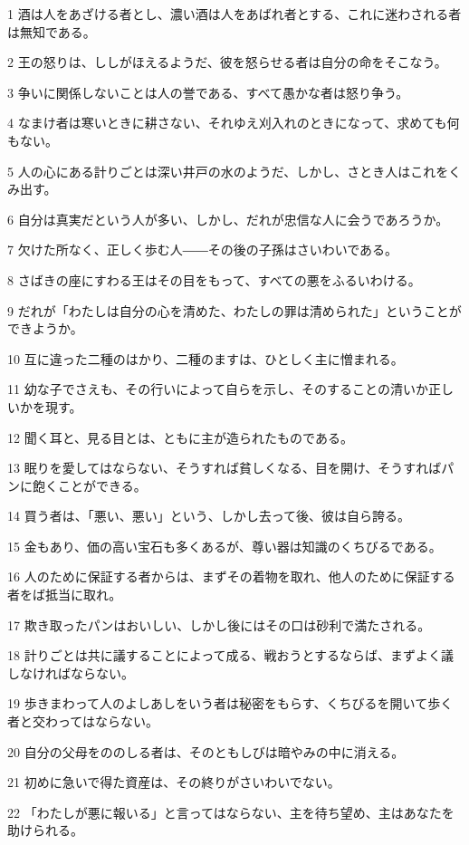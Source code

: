 \par 1 酒は人をあざける者とし、濃い酒は人をあばれ者とする、これに迷わされる者は無知である。
\par 2 王の怒りは、ししがほえるようだ、彼を怒らせる者は自分の命をそこなう。
\par 3 争いに関係しないことは人の誉である、すべて愚かな者は怒り争う。
\par 4 なまけ者は寒いときに耕さない、それゆえ刈入れのときになって、求めても何もない。
\par 5 人の心にある計りごとは深い井戸の水のようだ、しかし、さとき人はこれをくみ出す。
\par 6 自分は真実だという人が多い、しかし、だれが忠信な人に会うであろうか。
\par 7 欠けた所なく、正しく歩む人――その後の子孫はさいわいである。
\par 8 さばきの座にすわる王はその目をもって、すべての悪をふるいわける。
\par 9 だれが「わたしは自分の心を清めた、わたしの罪は清められた」ということができようか。
\par 10 互に違った二種のはかり、二種のますは、ひとしく主に憎まれる。
\par 11 幼な子でさえも、その行いによって自らを示し、そのすることの清いか正しいかを現す。
\par 12 聞く耳と、見る目とは、ともに主が造られたものである。
\par 13 眠りを愛してはならない、そうすれば貧しくなる、目を開け、そうすればパンに飽くことができる。
\par 14 買う者は、「悪い、悪い」という、しかし去って後、彼は自ら誇る。
\par 15 金もあり、価の高い宝石も多くあるが、尊い器は知識のくちびるである。
\par 16 人のために保証する者からは、まずその着物を取れ、他人のために保証する者をば抵当に取れ。
\par 17 欺き取ったパンはおいしい、しかし後にはその口は砂利で満たされる。
\par 18 計りごとは共に議することによって成る、戦おうとするならば、まずよく議しなければならない。
\par 19 歩きまわって人のよしあしをいう者は秘密をもらす、くちびるを開いて歩く者と交わってはならない。
\par 20 自分の父母をののしる者は、そのともしびは暗やみの中に消える。
\par 21 初めに急いで得た資産は、その終りがさいわいでない。
\par 22 「わたしが悪に報いる」と言ってはならない、主を待ち望め、主はあなたを助けられる。
